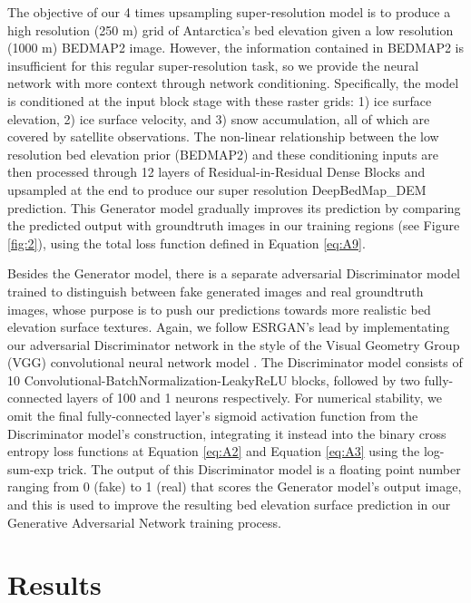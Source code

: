 \documentclass[tc, manuscript]{copernicus}
\begin{document}
The objective of our 4 times upsampling super-resolution model is to produce a high resolution (250 m) grid of Antarctica's bed elevation given a low resolution (1000 m) BEDMAP2 \citep{FretwellBedmap2improvedice2013} image.
However, the information contained in BEDMAP2 is insufficient for this regular super-resolution task, so we provide the neural network with more context through network conditioning.
Specifically, the model is conditioned at the input block stage with these raster grids: 1) ice surface elevation, 2) ice surface velocity, and 3) snow accumulation, all of which are covered by satellite observations.
The non-linear relationship between the low resolution bed elevation prior (BEDMAP2) and these conditioning inputs are then processed through 12 layers of Residual-in-Residual Dense Blocks \citep[see][]{WangESRGANEnhancedSuperResolution2018} and upsampled at the end to produce our super resolution DeepBedMap\_DEM prediction.
This Generator model gradually improves its prediction by comparing the predicted output with groundtruth images in our training regions (see Figure \ref{fig:2}), using the total loss function defined in Equation \eqref{eq:A9}.

Besides the Generator model, there is a separate adversarial Discriminator model \citep{GoodfellowGenerativeAdversarialNetworks2014} trained to distinguish between fake generated images and real groundtruth images, whose purpose is to push our predictions towards more realistic bed elevation surface textures.
Again, we follow ESRGAN's \citep{WangESRGANEnhancedSuperResolution2018} lead by implementating our adversarial Discriminator network in the style of the Visual Geometry Group (VGG) convolutional neural network model \citep{SimonyanVeryDeepConvolutional2014}.
The Discriminator model consists of 10 Convolutional-BatchNormalization-LeakyReLU blocks, followed by two fully-connected layers of 100 and 1 neurons respectively.
For numerical stability, we omit the final fully-connected layer's sigmoid activation function from the Discriminator model's construction, integrating it instead into the binary cross entropy loss functions at Equation \eqref{eq:A2} and Equation \eqref{eq:A3} using the log-sum-exp trick.
The output of this Discriminator model is a floating point number ranging from 0 (fake) to 1 (real) that scores the Generator model's output image, and this is used to improve the resulting bed elevation surface prediction in our Generative Adversarial Network training process.


\section{Results}
\end{document}
